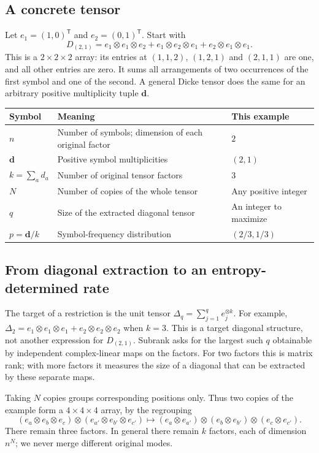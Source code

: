 \subsection*{A concrete tensor}

Let $e_1=(1,0)^{\mathsf T}$ and $e_2=(0,1)^{\mathsf T}$. Start with
\[
 D_{(2,1)}=e_1\otimes e_1\otimes e_2
          +e_1\otimes e_2\otimes e_1
          +e_2\otimes e_1\otimes e_1.
\]
This is a $2\times2\times2$ array: its entries at $(1,1,2)$, $(1,2,1)$
and $(2,1,1)$ are one, and all other entries are zero. It sums all
arrangements of two occurrences of the first symbol and one of the
second. A general Dicke tensor does the same for an arbitrary positive
multiplicity tuple $\mathbf d$.

\begin{center}
\begin{tabular}{@{}lp{}l@{}}
\toprule
Symbol & Meaning & This example\\
\midrule
$n$ & Number of symbols; dimension of each original factor & $2$\\
$\mathbf d$ & Positive symbol multiplicities & $(2,1)$\\
$k=\sum_a d_a$ & Number of original tensor factors & $3$\\
$N$ & Number of copies of the whole tensor & Any positive integer\\
$q$ & Size of the extracted diagonal tensor & An integer to maximize\\
$p=\mathbf d/k$ & Symbol-frequency distribution & $(2/3,1/3)$\\
\bottomrule
\end{tabular}
\end{center}

\subsection*{From diagonal extraction to an entropy-determined rate}

The target of a restriction is the unit tensor
$\Delta_q=\sum_{j=1}^q e_j^{\otimes k}$. For example,
$\Delta_2=e_1\otimes e_1\otimes e_1+e_2\otimes e_2\otimes e_2$
when $k=3$. This is a target diagonal structure, not another expression
for $D_{(2,1)}$. Subrank asks for the largest such $q$ obtainable by
independent complex-linear maps on the factors. For two factors this
is matrix rank; with more factors it measures the size of a diagonal
that can be extracted by these separate maps.

Taking $N$ copies groups corresponding positions only. Thus two copies
of the example form a $4\times4\times4$ array, by the regrouping
\[
 (e_a\otimes e_b\otimes e_c)\otimes
 (e_{a'}\otimes e_{b'}\otimes e_{c'})
 \longmapsto
 (e_a\otimes e_{a'})\otimes(e_b\otimes e_{b'})\otimes
 (e_c\otimes e_{c'}).
\]
There remain three factors. In general there remain $k$ factors, each
of dimension $n^N$; we never merge different original modes.

